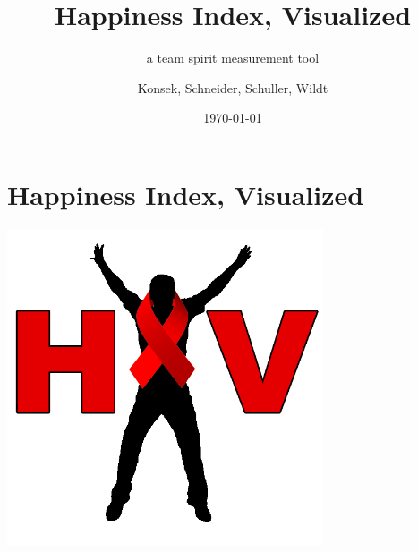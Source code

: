 \documentclass[10pt, compress]{beamer}
\title{Happiness Index, Visualized}
\subtitle{a team spirit measurement tool}
\date{\today}
\author{Konsek, Schneider, Schuller, Wildt}
\institute{Hochschule Rosenheim, FWPM JavaScript}
\begin{document}
\maketitle

\section{Happiness Index, Visualized}


\begin{frame}[fragile]
  \begin{center}
    \includegraphics[width=0.7\textwidth]{images/hivjs}
  \end{center}
\end{frame}
\end{document}
